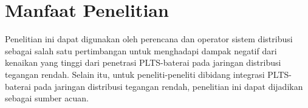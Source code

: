 \section{Manfaat Penelitian}
Penelitian ini dapat digunakan oleh perencana dan operator sistem distribusi sebagai salah satu pertimbangan untuk menghadapi dampak negatif dari kenaikan yang tinggi dari penetrasi PLTS-baterai pada jaringan distribusi tegangan rendah. Selain itu, untuk peneliti-peneliti dibidang integrasi PLTS-baterai pada jaringan distribusi tegangan rendah, penelitian ini dapat dijadikan sebagai sumber acuan. 





